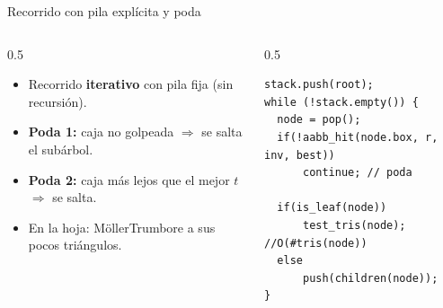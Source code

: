 \documentclass[aspectratio=169,11pt]{beamer}
\newcommand{\hl}[1]{{\color{primdk}\textbf{#1}}}
\begin{document}
\begin{frame}[fragile]{Recorrido con pila expl\'icita y poda}
\begin{columns}[T]
\begin{column}{0.5\textwidth}
\begin{itemize}\itemsep2pt
  \item Recorrido \hl{iterativo} con pila fija (sin recursi\'on).
  \item \hl{Poda 1:} caja no golpeada $\Rightarrow$ se salta el sub\'arbol.
  \item \hl{Poda 2:} caja m\'as lejos que el mejor $t$ $\Rightarrow$ se salta.
  \item En la hoja: M\"oller\textendash Trumbore a sus pocos tri\'angulos.
\end{itemize}
\end{column}
\begin{column}{0.5\textwidth}
\begin{lstlisting}
stack.push(root);
while (!stack.empty()) {
  node = pop();
  if(!aabb_hit(node.box, r, inv, best))
      continue; // poda
  
  if(is_leaf(node)) 
      test_tris(node); //O(#tris(node))
  else
      push(children(node));
}
\end{lstlisting}
\end{column}
\end{columns}
\end{frame}
\end{document}

